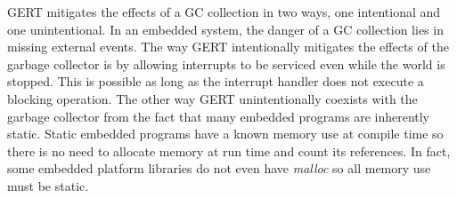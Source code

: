 GERT mitigates the effects of a GC collection in two ways, one intentional
and one unintentional. In an embedded system, the danger of a
GC collection lies in missing external events. The way GERT intentionally mitigates
the effects of the garbage collector is by allowing interrupts to be serviced
even while the world is stopped. This is possible as long as the interrupt
handler does not execute a blocking operation. The other way GERT unintentionally
coexists with the garbage collector from the fact that many embedded programs are
inherently static. Static embedded programs have a known memory use at compile time so
there is no need to allocate memory at run time and count its references. In fact, some embedded
platform libraries do not even have \textit{malloc} so all memory use must be static.



